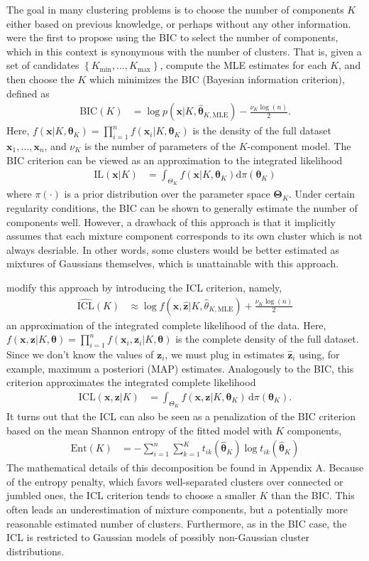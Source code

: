 \documentclass{uwstat572}
\newcommand*\ba{\[ \begin{aligned}}
\newcommand*\ea{\end{aligned} \]}
\newcommand*\set[1]{\left\{#1\right\}}
\newcommand*\estim[1]{\widehat{#1}}
\newcommand*\der{\text{d}}
\newcommand*\bx{\mathbf{x}}
\newcommand*\bz{\mathbf{z}}
\newcommand*\btheta{\boldsymbol{\theta}}
\newcommand*\bTheta{\boldsymbol{\Theta}}
\renewcommand\;{\,}
\begin{document}
The goal in many clustering problems is to choose the number of components $K$ either based on previous knowledge, or perhaps without any other information.
\citet{Dasgupta98} were the first to propose using the BIC to select the number of components, which in this context is synonymous with the number of clusters. 
That is, given a set of candidates $\set{K_\text{min}, \dotsc, K_\text{max}}$, compute the MLE estimates for each $K$, and then choose the $K$ which minimizes the BIC (Bayesian information criterion), defined as
\ba
\text{BIC}(K) 
	& = \log p(\bx | K, \estim\btheta_{K, \text{MLE}})
		- \frac{ \nu_K \log(n) }{2}.
\ea
Here,
$f(\bx | K, \btheta_K) = \prod_{i = 1}^n f(\bx_i | K, \btheta_K)$ is the density of the full dataset $\bx_1, \dotsc, \bx_n$, and
 $\nu_K$ is the number of parameters of the $K$-component model.
The BIC criterion can be viewed as an approximation to the integrated likelihood
\ba
\text{IL}(\bx | K)
	& = \int_{\Theta_K} f(\bx | K, \btheta_K) \der \pi(\btheta_K)
\ea
where $\pi(\cdot)$ is a prior distribution over the parameter space $\bTheta_K$.
Under certain regularity conditions, the BIC can be shown to generally estimate the number of components well.
However, a drawback of this approach is that it implicitly assumes that each mixture component corresponds to its own cluster which is not always desriable.
In other words, some clusters would be better estimated as mixtures of Gaussians themselves, which is unattainable with this approach. 

\citet{Biernacki00} modify this approach by introducing the ICL criterion, namely,
\ba
\estim{\text{ICL}}(K)
	& \approx 
	\log f(\bx, \estim\bz | K, \estim\theta_{K, \text{MLE}}) + \frac{ \nu_K \log(n) }{2}
\ea
an approximation of the integrated complete likelihood of the data. 
Here, $f(\bx, \bz | K, \btheta) = \prod_{i=1}^n f(\bx_i, \bz_i | K, \btheta)$ is the complete density of the full dataset.
Since we don't know the values of $\bz_i$, we must plug in estimates $\estim\bz_i$ using, for example, maximum a posteriori (MAP) estimates.
Analogously to the BIC, this criterion approximates the integrated complete likelihood
\ba
\text{ICL}(\bx, \bz | K)
	& = \int_{\Theta_K} f(\bx, \bz | K, \btheta_K) \; \der \pi(\btheta_K).
\ea
It turns out that the ICL can also be seen as a penalization of the BIC criterion based on the mean Shannon entropy of the fitted model with $K$ components, 
\ba
\text{Ent}(K)
	& = - \sum_{i=1}^n \sum_{k = 1}^K t_{ik}(\estim\btheta_K) \log t_{ik}(\estim\btheta_K)
\ea
The mathematical details of this decomposition be found in Appendix A.
Because of the entropy penalty, which favors well-separated clusters over connected or jumbled ones, the ICL criterion tends to choose a smaller $K$ than the BIC.
This often leads an underestimation of mixture components, but a potentially more reasonable estimated number of clusters.
Furthermore, as in the BIC case, the ICL is restricted to Gaussian models of possibly non-Gaussian cluster distributions.
\end{document}
